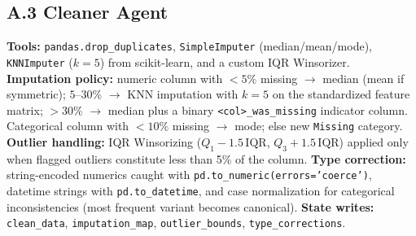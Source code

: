 \documentclass{article}
\begin{document}
\subsection*{A.3 Cleaner Agent}
\textbf{Tools:} \texttt{pandas.drop\_duplicates}, \texttt{SimpleImputer}
(median/mean/mode), \texttt{KNNImputer} ($k=5$) from scikit-learn, and a
custom IQR Winsorizer.
\textbf{Imputation policy:} numeric column with $<5\%$ missing
$\rightarrow$ median (mean if symmetric); $5$--$30\%$ $\rightarrow$ KNN
imputation with $k=5$ on the standardized feature matrix; $>30\%$
$\rightarrow$ median plus a binary \texttt{<col>\_was\_missing} indicator
column. Categorical column with $<10\%$ missing $\rightarrow$ mode; else
new \texttt{Missing} category.
\textbf{Outlier handling:} IQR Winsorizing
($Q_1 - 1.5\,\mathrm{IQR}$, $Q_3 + 1.5\,\mathrm{IQR}$) applied only when
flagged outliers constitute less than 5\% of the column.
\textbf{Type correction:} string-encoded numerics caught with
\texttt{pd.to\_numeric(errors='coerce')}, datetime strings with
\texttt{pd.to\_datetime}, and case normalization for categorical
inconsistencies (most frequent variant becomes canonical).
\textbf{State writes:} \texttt{clean\_data}, \texttt{imputation\_map},
\texttt{outlier\_bounds}, \texttt{type\_corrections}.
\end{document}
